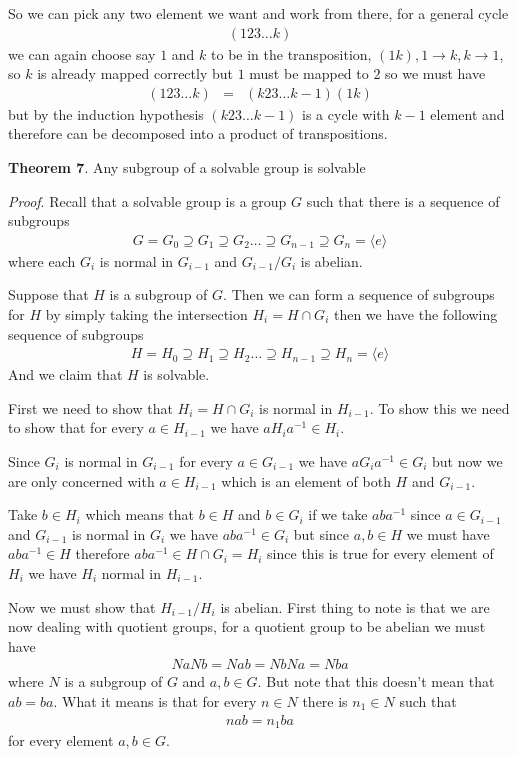 \documentclass[aps,preprint,preprintnumbers,nofootinbib,showpacs,prd]{revtex4-1}
\newcommand{\nbea}{\begin{eqnarray*}}
\newcommand{\neea}{\end{eqnarray*}}
\begin{document}
So we can pick any two element we want and work from there, for a general cycle
%
\nbea
(123\dots k)
\neea
%
we can again choose say $1$ and $k$ to be in the transposition, $(1k), 1 \to k, k \to 1$, so $k$ is already mapped correctly but $1$ must be mapped to $2$ so we must have
%
\nbea
(123\dots k) & = & (k23\dots k-1)(1k)
\neea
%
but by the induction hypothesis $(k23\dots k-1)$ is a cycle with $k-1$ element and therefore can be decomposed into a product of transpositions.

{\bf Theorem 7}. Any subgroup of a solvable group is solvable

{\it Proof}. Recall that a solvable group is a group $G$ such that there is a sequence of subgroups
%
\nbea
G = G_0 \supseteq G_1 \supseteq G_2 \dots \supseteq G_{n-1} \supseteq G_n = \langle e \rangle 
\neea
%
where each $G_i$ is normal in $G_{i-1}$ and $G_{i-1}/G_i$ is abelian.

Suppose that $H$ is a subgroup of $G$. Then we can form a sequence of subgroups for $H$ by simply taking the intersection $H_i = H \cap G_i$ then we have the following sequence of subgroups
%
\nbea
H = H_0 \supseteq H_1 \supseteq H_2 \dots \supseteq H_{n-1} \supseteq H_n = \langle e \rangle 
\neea
%
And we claim that $H$ is solvable.

First we need to show that $H_{i} = H \cap G_{i}$ is normal in $H_{i-1}$. To show this we need to show that for every $a \in H_{i-1}$ we have $aH_ia^{-1} \in H_i$. 

Since $G_{i}$ is normal in $G_{i-1}$ for every $a \in G_{i-1}$ we have $aG_ia^{-1} \in G_i$ but now we are only concerned with $a \in H_{i-1}$ which is an element of both $H$ and $G_{i-1}$.

Take $b \in H_{i}$ which means that $b \in H$ and $b \in G_i$ if we take $aba^{-1}$ since $a \in G_{i-1}$ and $G_{i-1}$ is normal in $G_i$ we have $aba^{-1} \in G_i$ but since $a,b \in H$ we must have $aba^{-1} \in H$ therefore $aba^{-1} \in H \cap G_i = H_i$ since this is true for every element of $H_i$ we have $H_i$ normal in $H_{i-1}$.

Now we must show that $H_{i-1}/H_i$ is abelian. First thing to note is that we are now dealing with quotient groups, for a quotient group to be abelian we must have 
%
\nbea
NaNb = Nab = NbNa = Nba
\neea
%
where $N$ is a subgroup of $G$ and $a,b \in G$. But note that this doesn't mean that $ab = ba$. What it means is that for every $n \in N$ there is $n_1 \in N$ such that 
%
\nbea
nab = n_1ba
\neea
%
for every element $a,b \in G$.
\end{document}
